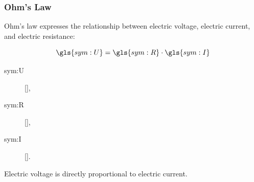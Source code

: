 \begin{frame}
	\frametitle{Ohm's Law}
	
	Ohm's law expresses the relationship between electric voltage, electric current, and electric resistance:
	
	\[
	\gls{sym:U} = \gls{sym:R} \cdot \gls{sym:I}
	\]
	
	\vspace{4mm}
	
	\begin{description}
		\item[\gls{sym:U}]  [],
		\item[\gls{sym:R}]  [],
		\item[\gls{sym:I}]  [].
	\end{description}
	
	Electric voltage is directly proportional to electric current.
	
\end{frame}
